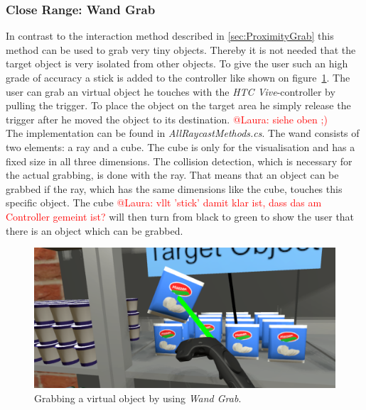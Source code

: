 \subsubsection{Close Range: Wand Grab} \label{sec:WandGrab}
In contrast to the interaction method described in \ref{sec:ProximityGrab} this method can be used to grab very tiny objects. Thereby it is not needed that the target object is very isolated from other objects. To give the user such an high grade of accuracy a stick is added to the controller like shown on figure~\ref{fig:wandGrab}. The user can grab an virtual object he touches with the \textit{HTC Vive}-controller by pulling the trigger. To place the object on the target area he simply release the trigger after he moved the object to its destination. \textcolor{red}{@Laura: siehe oben ;)}\\
The implementation can be found in \textit{AllRaycastMethods.cs}. The wand consists of two elements: a ray \cite{website:Ray} and a cube. The cube is only for the visualisation and has a fixed size in all three dimensions. The collision detection, which is necessary for the actual grabbing, is done with the ray. That means that an object can be grabbed if the ray, which has the same dimensions like the cube, touches this specific object. The cube \textcolor{red}{@Laura: vllt 'stick' damit klar ist, dass das am Controller gemeint ist?} will then turn from black to green to show the user that there is an object which can be grabbed.

\begin{figure}[H] 
	\center 
	\includegraphics[width=12cm]{Images/WandGrab.PNG}			
	\caption[Grabbing a virtual object by using \textit{Wand Grab}.]{Grabbing a virtual object by using \textit{Wand Grab}.}
	\label{fig:wandGrab}
\end{figure}

